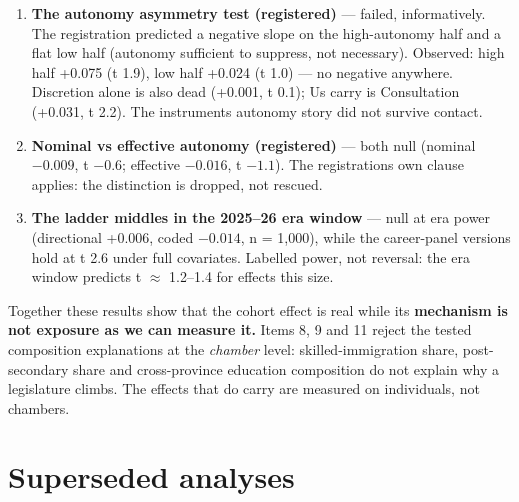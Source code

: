 \begin{enumerate}
  null (A \(-0.036\), t \(-1.2\); \(A^{2}\) \(-0.003\), t \(-0.2\)), implied peak outside the
  observed range, concave-with-interior-peak in only 44.1\% of 2,000 member
  resamples. The registered interior-peak claim fails in its continuous
  form; the middle-peak result is carried by the discrete level slopes and
  the apex delta (\cref{sec:occupation}), not by this test.
\item
  \textbf{The autonomy asymmetry test (registered)} --- failed, informatively. The
  registration predicted a negative slope on the high-autonomy half and a
  flat low half (autonomy sufficient to suppress, not necessary). Observed:
  high half +0.075 (t 1.9), low half +0.024 (t 1.0) --- no negative anywhere.
  Discretion alone is also dead (+0.001, t 0.1); U\textquotesingle s carry is Consultation
  (+0.031, t 2.2). The instrument\textquotesingle s autonomy story did not survive contact.
\item
  \textbf{Nominal vs effective autonomy (registered)} --- both null (nominal
  \(-0.009\), t \(-0.6\); effective \(-0.016\), t \(-1.1\)). The registration\textquotesingle s own clause
  applies: the distinction is dropped, not rescued.
\item
  \textbf{The ladder middles in the 2025--26 era window} --- null at era power
  (directional +0.006, coded \(-0.014\), n = 1,000), while the career-panel
  versions hold at t 2.6 under full covariates. Labelled power, not
  reversal: the era window predicts t \(\approx\) 1.2--1.4 for effects this size.
\end{enumerate}

Together these results show that the cohort effect is real while its
\textbf{mechanism is not exposure as we can measure it.} Items 8, 9 and 11 reject
the tested composition explanations at the \emph{chamber} level:
skilled-immigration share, post-secondary share and cross-province education
composition do not explain why a legislature climbs. The effects that do carry
are measured on individuals, not chambers.

\section{Superseded analyses}\label{app:superseded}

